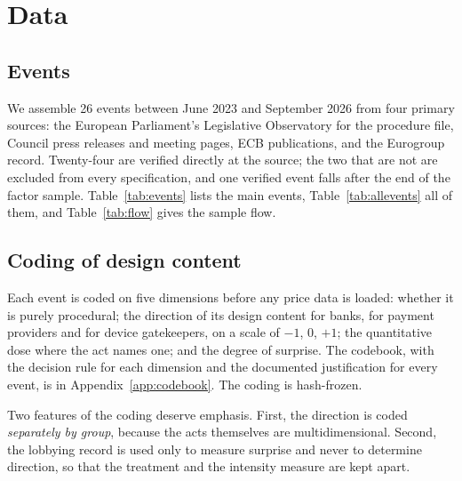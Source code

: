 \documentclass[11pt]{article}
\theoremstyle{plain}\newtheorem{proposition}{Proposition}
\begin{document}
\section{Data}\label{sec:data}

\subsection{Events}

We assemble 26 events between June 2023 and September 2026 from four primary sources: the European Parliament's Legislative Observatory for the procedure file, Council press releases and meeting pages, ECB publications, and the Eurogroup record. Twenty-four are verified directly at the source; the two that are not are excluded from every specification, and one verified event falls after the end of the factor sample. Table~\ref{tab:events} lists the main events, Table~\ref{tab:allevents} all of them, and Table~\ref{tab:flow} gives the sample flow.

\subsection{Coding of design content}

Each event is coded on five dimensions before any price data is loaded: whether it is purely procedural; the direction of its design content for banks, for payment providers and for device gatekeepers, on a scale of $-1$, $0$, $+1$; the quantitative dose where the act names one; and the degree of surprise. The codebook, with the decision rule for each dimension and the documented justification for every event, is in Appendix~\ref{app:codebook}. The coding is hash-frozen.

Two features of the coding deserve emphasis. First, the direction is coded \emph{separately by group}, because the acts themselves are multidimensional. Second, the lobbying record is used only to measure surprise and never to determine direction, so that the treatment and the intensity measure are kept apart.
\end{document}

